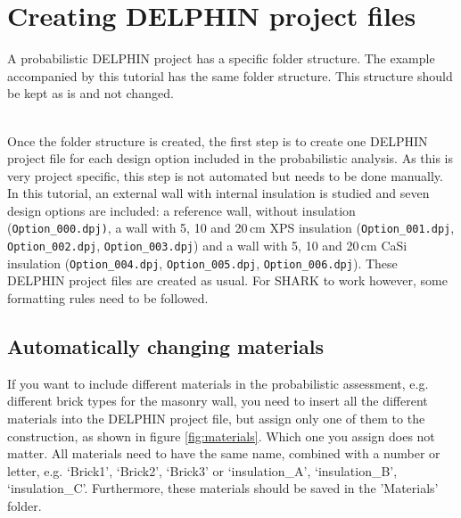 \documentclass{article}
\newcommand{\file}[1]{{\small\texttt{#1}}}
\begin{document}
\section{Creating DELPHIN project files}
A probabilistic DELPHIN project has a specific folder structure. The example accompanied by this tutorial has the same folder structure. This structure should be kept as is and not changed. \vspace{0.3cm}

\begin{minipage}{0.75\linewidth}
\end{minipage}
\vspace{0.3cm}\\
Once the folder structure is created, the first step is to create one DELPHIN project file for each design option included in the probabilistic analysis. As this is very project specific, this step is not automated but needs to be done manually. In this tutorial, an external wall with internal insulation is studied and seven design options are included: a reference wall, without insulation (\file{Option\_000.dpj)}, a wall with 5, 10 and 20\,cm XPS insulation (\file{Option\_001.dpj}, \file{Option\_002.dpj}, \file{Option\_003.dpj}) and a wall with 5, 10 and 20\,cm CaSi insulation (\file{Option\_004.dpj}, \file{Option\_005.dpj}, \file{Option\_006.dpj}). These DELPHIN project files are created as usual. For SHARK to work however, some formatting rules need to be followed.

\subsection{Automatically changing materials}
If you want to include different materials in the probabilistic assessment, e.g. different brick types for the masonry wall, you need to insert all the different materials into the DELPHIN project file, but assign only one of them to the construction, as shown in figure \ref{fig:materials}. Which one you assign does not matter. All materials need to have the same name, combined with a number or letter, e.g. `Brick1', `Brick2', `Brick3' or `insulation\_A', `insulation\_B', `insulation\_C'. Furthermore, these materials should be saved in the 'Materials' folder. 
\end{document}
